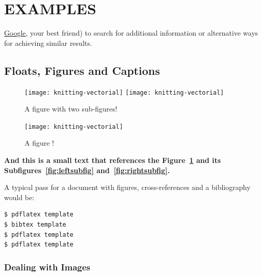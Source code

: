 

\section{EXAMPLES}
\href{http://www.google.com}{Google}, your best friend) to search for additional information or alternative ways for achieving similar results.




\subsection{Floats, Figures and Captions} %
\label{sec:floats_figures_and_captions}



\begin{figure}[htbp]
  \centering
    {\texttt{[image: knitting-vectorial]}}%
    {\texttt{[image: knitting-vectorial]}}%
  \caption{A figure with two sub-figures!}
  \label{fig:fig2subfig}
\end{figure}


\begin{figure}[htbp]
  \centering
  
    {\texttt{[image: knitting-vectorial]}}%
 
  \caption{A figure !}
  \label{fig:test1}
\end{figure}

\textbf{And this is a small text that references the Figure~\ref{fig:fig2subfig} and its Subfigures~\ref{fig:leftsubfig} and~\ref{fig:rightsubfig}.}

A typical pass for a document with figures, cross-references and a bibliography would be:
\begin{verbatim}
$ pdflatex template
$ bibtex template
$ pdflatex template
$ pdflatex template
\end{verbatim}


\subsubsection{Dealing with Images} %
\label{sub:dealing_with_images}

